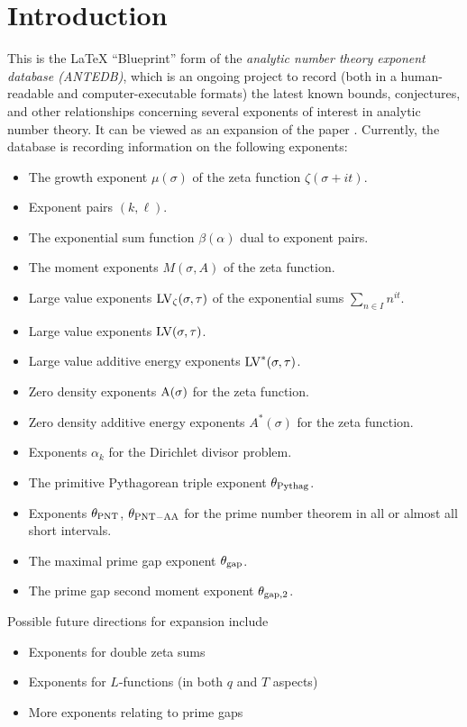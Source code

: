 \chapter{Introduction}

This is the LaTeX ``Blueprint'' form of the \emph{analytic number theory exponent database (ANTEDB)}, which is an ongoing project to record (both in a human-readable and computer-executable formats) the latest known bounds, conjectures, and other relationships concerning several exponents of interest in analytic number theory.  It can be viewed as an expansion of the paper \cite{trudgian-yang}. Currently, the database is recording information on the following exponents:

\begin{itemize}
\item The growth exponent $\mu(\sigma)$ of the zeta function $\zeta(\sigma+it)$.
\item Exponent pairs $(k,\ell)$.
\item The exponential sum function $\beta(\alpha)$ dual to exponent pairs.
\item The moment exponents $M(\sigma,A)$ of the zeta function.
\item Large value exponents $\mathrm{LV}_\zeta(\sigma, \tau)$ of the exponential sums $\sum_{n \in I} n^{it}$.
\item Large value exponents $\mathrm{LV}(\sigma, \tau)$.
\item Large value additive energy exponents $\mathrm{LV}^*(\sigma, \tau)$.
\item Zero density exponents $\mathrm{A}(\sigma)$ for the zeta function.
\item Zero density additive energy exponents $A^*(\sigma)$ for the zeta function.
\item Exponents $\alpha_k$ for the Dirichlet divisor problem.
\item The primitive Pythagorean triple exponent $\theta_{\mathrm{Pythag}}$.
\item Exponents $\theta_{\mathrm{PNT}}$, $\theta_{\mathrm{PNT-AA}}$ for the prime number theorem in all or almost all short intervals.
\item The maximal prime gap exponent $\theta_{\mathrm{gap}}$.
\item The prime gap second moment exponent $\theta_{\mathrm{gap},2}$.
\end{itemize}

Possible future directions for expansion include
\begin{itemize}
    \item Exponents for double zeta sums
    \item Exponents for $L$-functions (in both $q$ and $T$ aspects)
    \item More exponents relating to prime gaps
\end{itemize}

